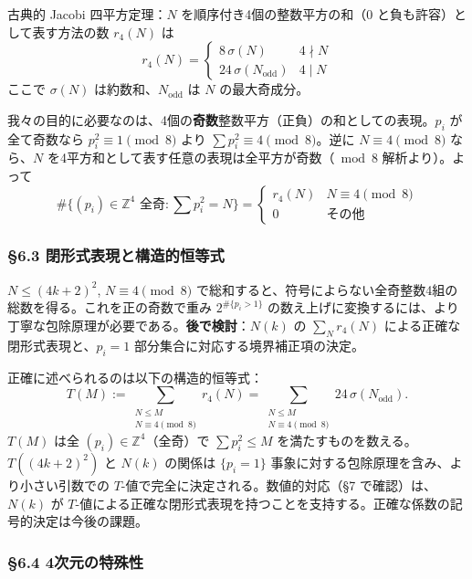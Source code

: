 \documentclass[a4paper,11pt]{ltjsarticle}
\theoremstyle{definition}
\begin{document}
古典的 Jacobi 四平方定理：\(N\) を順序付き4個の整数平方の和（0
と負も許容）として表す方法の数 \(r_4(N)\) は
\[r_4(N) = \begin{cases} 8\,\sigma(N) & 4 \nmid N \\ 24\,\sigma(N_{\mathrm{odd}}) & 4 \mid N \end{cases}\]
ここで \(\sigma(N)\) は約数和、\(N_{\mathrm{odd}}\) は \(N\)
の最大奇成分。

我々の目的に必要なのは、4個の\textbf{奇数}整数平方（正負）の和としての表現。\(p_i\)
が全て奇数なら \(p_i^2 \equiv 1 \pmod 8\) より
\(\sum p_i^2 \equiv 4 \pmod 8\)。逆に \(N \equiv 4 \pmod 8\) なら、\(N\)
を4平方和として表す任意の表現は全平方が奇数（\(\bmod 8\)
解析より）。よって
\[\#\{(p_i) \in \mathbb{Z}^4 \text{ 全奇} : \sum p_i^2 = N\} = \begin{cases} r_4(N) & N \equiv 4 \pmod 8 \\ 0 & \text{その他} \end{cases}\]

\subsubsection{§6.3
閉形式表現と構造的恒等式}\label{ux9589ux5f62ux5f0fux8868ux73feux3068ux69cbux9020ux7684ux6052ux7b49ux5f0f}

\(N \le (4k+2)^2\), \(N \equiv 4 \pmod 8\)
で総和すると、符号によらない全奇整数4組の総数を得る。これを正の奇数で重み
\(2^{\#\{p_i > 1\}}\)
の数え上げに変換するには、より丁寧な包除原理が必要である。\textbf{後で検討}：\(N(k)\)
の \(\sum_N r_4(N)\) による正確な閉形式表現と、\(p_i = 1\)
部分集合に対応する境界補正項の決定。

正確に述べられるのは以下の構造的恒等式：
\[T(M) := \sum_{\substack{N \le M \\ N \equiv 4 \pmod 8}} r_4(N) = \sum_{\substack{N \le M \\ N \equiv 4 \pmod 8}} 24\,\sigma(N_{\mathrm{odd}}).\]
\(T(M)\) は全 \((p_i) \in \mathbb{Z}^4\)（全奇）で \(\sum p_i^2 \le M\)
を満たすものを数える。\(T((4k+2)^2)\) と \(N(k)\) の関係は
\(\{p_i = 1\}\) 事象に対する包除原理を含み、より小さい引数での
\(T\)-値で完全に決定される。数値的対応（§7 で確認）は、\(N(k)\) が
\(T\)-値による正確な閉形式表現を持つことを支持する。正確な係数の記号的決定は今後の課題。

\subsubsection{§6.4
4次元の特殊性}\label{ux6b21ux5143ux306eux7279ux6b8aux6027}
\end{document}
